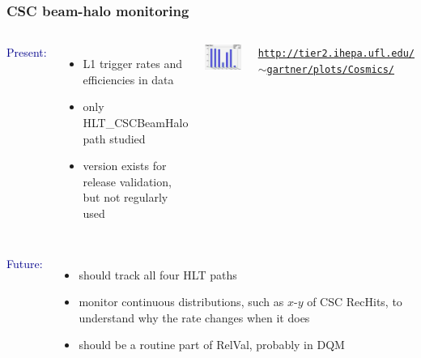 \documentclass[compress]{beamer}
\begin{document}
\begin{frame}
\frametitle{CSC beam-halo monitoring}

\begin{columns}
\textcolor{darkblue}{Present:}
\begin{itemize}
\item L1 trigger rates and efficiencies in data
\item only HLT\_CSCBeamHalo path studied
\item version exists for release validation, but not regularly used
\end{itemize}

\includegraphics[width=\linewidth]{TriggerOcc.png}

\textcolor{blue}{\mbox{\hspace{-1.4 cm}} \tt \tiny \href{http://tier2.ihepa.ufl.edu/~gartner/plots/Cosmics/}{http://tier2.ihepa.ufl.edu/$\sim$gartner/plots/Cosmics/}\mbox{\hspace{-2 cm}}}
\end{columns}

\vspace{0.5 cm}
\begin{columns}
\textcolor{darkblue}{Future:}
\begin{itemize}
\item should track all four HLT paths
\item monitor continuous distributions, such as $x$-$y$ of CSC RecHits, to understand why the rate changes when it does
\item should be a routine part of RelVal, probably in DQM
\end{itemize}
\end{columns}
\end{frame}
\end{document}
